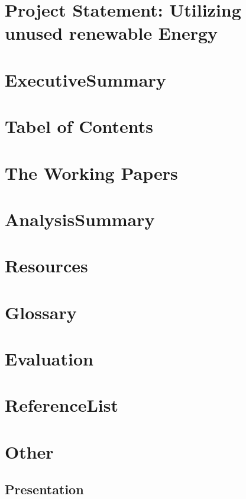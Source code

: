 \documentclass[12pt,a4paper]{article}
\begin{document}

\newpage
\section{Project Statement: Utilizing unused renewable Energy}

\newpage
\section{ExecutiveSummary} %

\clearpage
\section{Tabel of Contents}%
\tableofcontents
\clearpage
\section{The Working Papers} %





%
\clearpage
\section{AnalysisSummary} %

\clearpage
\section{Resources} %

\clearpage
\section{Glossary} %

\clearpage
\section{Evaluation} %

\clearpage
\section{ReferenceList} %

\clearpage
\section{Other} %
\subsection{Presentation}

\clearpage
\end{document}
